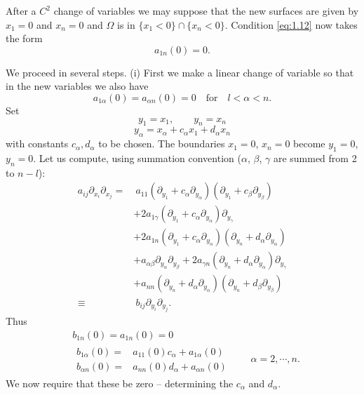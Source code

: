 After a $C^2$ change of variables we may suppose that the new surfaces are given by $x_1 =0$ and $x_n=0$ and $\Omega$ is in $\{x_1 <0\}\cap\{x_n <0\}$. Condition \eqref{eq:1.12} now takes the form
\begin{equation}\label{eq:A.5}
	a_{1n}(0)=0.
\end{equation}

We proceed in several steps.
(i) First we make a linear change of variable so that in the new variables we also have
\begin{equation}\label{eq:A.6}
	a_{1\alpha}(0)=a_{\alpha n}(0)=0\quad\text{for}\quad l<\alpha<n.
\end{equation}
Set
\[y_1=x_1,\qquad y_n=x_n\]
\[y_{\alpha} = x_{\alpha} + c_{\alpha}x_1 + d_{\alpha}x_n\]
with constants $c_{\alpha}, d_{\alpha}$ to be chosen. The boundaries $x_1 =0$, $x_n=0$ become $y_1 =0$, $y_n=0$. Let us compute, using summation convention ($\alpha$, $\beta$, $\gamma$ are summed from 2 to $n-l$):
\[\begin{aligned}
	a_{ij}\partial_{x_i}\partial_{x_j} =&\ a_{11}\left( \partial_{y_1} + c_{\alpha} \partial_{y_{\alpha}}  \right) \left( \partial_{y_1} + c_{\beta} \partial_{y_{\beta}}  \right)\\
	&+ 2a_{1\gamma}\left( \partial_{y_1} + c_{\alpha} \partial_{y_{\alpha}}  \right)\partial_{y_{\gamma}} \\
	&+ 2a_{1n}\left( \partial_{y_1} + c_{\alpha} \partial_{y_{\alpha}}  \right) \left( \partial_{y_n} + d_{\alpha} \partial_{y_{\alpha}}  \right)\\
	&+ a_{\alpha\beta} \partial_{y_{\alpha}} \partial_{y_{\beta}} + 2a_{\gamma n} \left(\partial_{y_n} + d_{\alpha} \partial_{y_{\alpha}} \right) \partial_{y_{\gamma}}\\
	&+ a_{nn}\left( \partial_{y_n} + d_{\alpha} \partial_{y_{\alpha}}  \right) \left( \partial_{y_n} + d_{\beta} \partial_{y_{\beta}}  \right)\\
	\equiv &\ b_{ij}\partial_{y_i}\partial_{y_j}.
\end{aligned}\]
Thus
\[\begin{aligned}
	&\left. b_{1n}(0)=a_{1n}(0)=0 \right.\\
	&\left. \begin{aligned}
		b_{1\alpha}(0)=&a_{11}(0)c_{\alpha}+a_{1\alpha}(0)\\
		b_{\alpha n}(0)=&a_{nn}(0)d_{\alpha}+a_{\alpha n}(0)
	\end{aligned} \right.\qquad \alpha=2,\cdots,n.
\end{aligned}\]
We now require that these be zero -- determining the $c_{\alpha}$ and $d_{\alpha}$.

